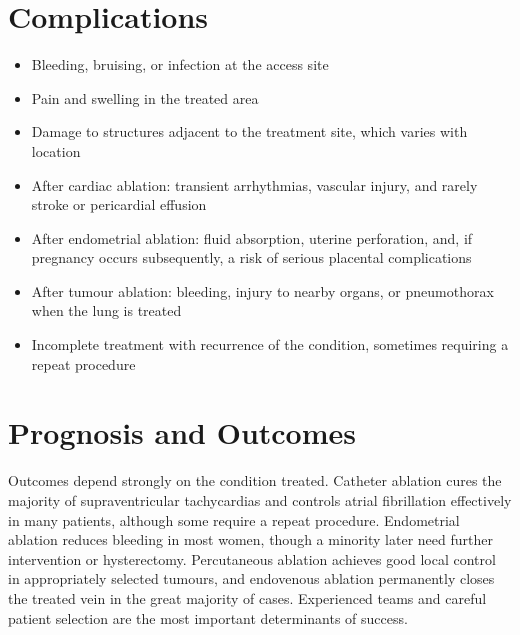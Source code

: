 \section*{Complications}
\begin{itemize}
    \item Bleeding, bruising, or infection at the access site
    \item Pain and swelling in the treated area
    \item Damage to structures adjacent to the treatment site, which varies with location
    \item After cardiac ablation: transient arrhythmias, vascular injury, and rarely stroke or pericardial effusion
    \item After endometrial ablation: fluid absorption, uterine perforation, and, if pregnancy occurs subsequently, a risk of serious placental complications
    \item After tumour ablation: bleeding, injury to nearby organs, or pneumothorax when the lung is treated
    \item Incomplete treatment with recurrence of the condition, sometimes requiring a repeat procedure
\end{itemize}

\section*{Prognosis and Outcomes}
Outcomes depend strongly on the condition treated. Catheter ablation cures the majority of supraventricular tachycardias and controls atrial fibrillation effectively in many patients, although some require a repeat procedure. Endometrial ablation reduces bleeding in most women, though a minority later need further intervention or hysterectomy. Percutaneous ablation achieves good local control in appropriately selected tumours, and endovenous ablation permanently closes the treated vein in the great majority of cases. Experienced teams and careful patient selection are the most important determinants of success.

